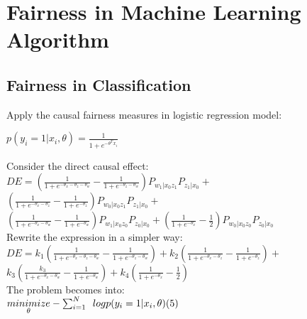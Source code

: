 \documentclass{article} %
\begin{document}
\section{Fairness in Machine Learning Algorithm}
\subsection{Fairness in Classification}
\hspace*{1em}Apply the causal fairness measures in logistic regression model:\\
\centerline{$p(y_i=1|x_i, \theta) = \frac{1}{1+e^{-\theta^Tx_i}}$}
\hspace*{1em}Consider the direct causal effect:\\
$DE = (\frac{1}{1+e^{-\theta_x-\theta_z-\theta_w}}- \frac{1}{1+e^{-\theta_z-\theta_w}}) P_{w_1|x_0z_1}P_{z_1|x_0} + $
$(\frac{1}{1+e^{-\theta_x-\theta_z}}- \frac{1}{1+e^{-\theta_z}}) P_{w_0|x_0z_1}P_{z_1|x_0} + $\\
\hspace*{3em}$(\frac{1}{1+e^{-\theta_x-\theta_w}}- \frac{1}{1+e^{-\theta_w}}) P_{w_1|x_0z_0}P_{z_0|x_0} + 
(\frac{1}{1+e^{-\theta_x}}- \frac{1}{2})P_{w_0|x_0z_0}P_{z_0|x_0}$\\
\hspace*{1em}Rewrite the expression in a simpler way:\\
$DE = k_1(\frac{1}{1+e^{-\theta_x-\theta_z-\theta_w}}- \frac{1}{1+e^{-\theta_z-\theta_w}}) + k_2(\frac{1}{1+e^{-\theta_x-\theta_z}}- \frac{1}{1+e^{-\theta_z}}) +$\\
\hspace*{3em}$ k_3(\frac{k_3}{1+e^{-\theta_x-\theta_w}}- \frac{1}{1+e^{-\theta_w}})+k_4(\frac{1}{1+e^{-\theta_x}}- \frac{1}{2}) $\\
\hspace*{1em}The problem becomes into:\\
\hspace*{12em}$\underset{\theta}{minimize} -\sum_{i=1}^{N}\,\,\, logp(y_i=1|x_i, \theta) \hfill(5)$\\
\\
\end{document}
